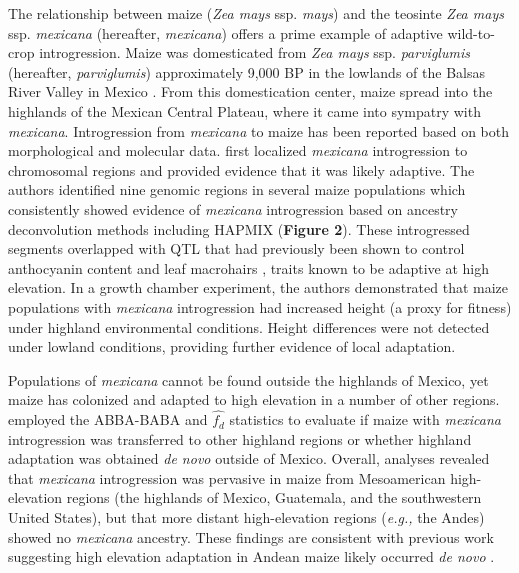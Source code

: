 \documentclass[11pt]{article}
\begin{document}
{\begin{enumerate}
The relationship between maize (\emph{Zea mays} ssp. \emph{mays}) and the teosinte \emph{Zea mays} ssp. \emph{mexicana} (hereafter, \emph{mexicana}) offers a prime example of adaptive wild-to-crop introgression.
Maize was domesticated from \emph{Zea mays} ssp. \emph{parviglumis} (hereafter, \emph{parviglumis})  approximately 9,000 BP in the lowlands of the Balsas River Valley in Mexico \citep{matsuoka2002single}.
From this domestication center, maize spread into the highlands of the Mexican Central Plateau, where it came into sympatry with \emph{mexicana}.
Introgression from \emph{mexicana} to maize has been reported based on both morphological \citep{wilkes1977} and molecular \citep{vanHeerwaarden2011, doebley1987} data.
\citet{Hufford2013} first localized \emph{mexicana} introgression to chromosomal regions and provided evidence that it was likely adaptive.
The authors identified nine genomic regions in several maize populations which consistently showed evidence of \emph{mexicana} introgression based on ancestry deconvolution methods including HAPMIX (\textbf{Figure 2}).
These introgressed segments overlapped with QTL that had previously been shown to control anthocyanin content and leaf macrohairs \citep{lauter2004}, traits known to be adaptive at high elevation.
In a growth chamber experiment, the authors demonstrated that maize populations with \emph{mexicana} introgression had increased height (a proxy for fitness) under highland environmental conditions.
Height differences were not detected under lowland conditions, providing further evidence of local adaptation.


Populations of \emph{mexicana} cannot be found outside the highlands of Mexico, yet maize has colonized and adapted to high elevation in a number of other regions.
\citet{Wang2017} employed the ABBA-BABA and $\hat{f_{d}}$ statistics to evaluate if maize with \emph{mexicana} introgression was transferred to other highland regions or whether highland adaptation was obtained \emph{de novo} outside of Mexico.
Overall, analyses revealed that  \emph{mexicana} introgression was pervasive in maize from Mesoamerican high-elevation regions (the highlands of Mexico, Guatemala, and the southwestern United States), but that more distant high-elevation regions (\emph{e.g.,} the Andes) showed no \emph{mexicana} ancestry.
These findings are consistent with previous work suggesting high elevation adaptation in Andean maize likely occurred \emph{de novo} \citep{Takuno2015}.



\end{enumerate}}
\end{document}
